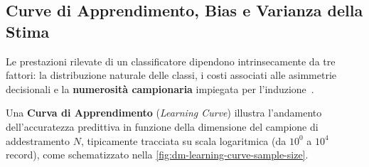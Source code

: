 \FloatBarrier
\subsection{Curve di Apprendimento, Bias e Varianza della Stima}
\label{subsec:dm-learning-curves-bias-variance}

Le prestazioni rilevate di un classificatore dipendono intrinsecamente da tre fattori: la distribuzione naturale delle classi, i costi associati alle asimmetrie decisionali e la \textbf{numerosità campionaria} impiegata per l'induzione~\cite{tan2018}.

Una \textbf{Curva di Apprendimento} (\textit{Learning Curve}) illustra l'andamento dell'accuratezza predittiva in funzione della dimensione del campione di addestramento $N$, tipicamente tracciata su scala logaritmica (da $10^0$ a $10^4$ record), come schematizzato nella \autoref{fig:dm-learning-curve-sample-size}.

